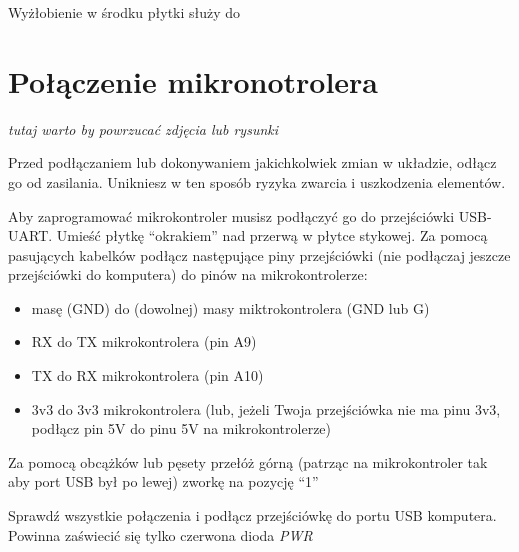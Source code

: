 \documentclass{pdfBooklets}
\begin{document}
  Wyżłobienie w środku płytki służy do 



\section{Połączenie mikronotrolera}
\textit {tutaj warto by powrzucać zdjęcia lub rysunki}

\begin{ProTip}{}
  Przed podłączaniem lub dokonywaniem jakichkolwiek zmian w układzie, odłącz go od zasilania. Unikniesz
  w ten sposób ryzyka zwarcia i uszkodzenia elementów.
\end{ProTip}

Aby zaprogramować mikrokontroler musisz podłączyć go do przejściówki USB-UART. Umieść płytkę ``okrakiem'' nad przerwą
w płytce stykowej. Za pomocą pasujących kabelków podłącz następujące piny przejściówki (nie podłączaj jeszcze
przejściówki do komputera) do pinów na mikrokontrolerze:
\begin{itemize}
\item masę (GND) do (dowolnej) masy miktrokontrolera (GND lub G)
\item RX do TX mikrokontrolera (pin A9)
\item TX do RX mikrokontrolera (pin A10)
\item 3v3 do 3v3 mikrokontrolera (lub, jeżeli Twoja przejściówka nie ma pinu 3v3, podłącz pin 5V do pinu 5V na
  mikrokontrolerze)
\end{itemize}

Za pomocą obcążków lub pęsety przełóż górną (patrząc na mikrokontroler tak aby port USB był po lewej) zworkę na
pozycję ``1''

Sprawdź wszystkie połączenia i podłącz przejściówkę do portu USB komputera. Powinna zaświecić się tylko czerwona dioda
\textit{PWR}
\end{document}
